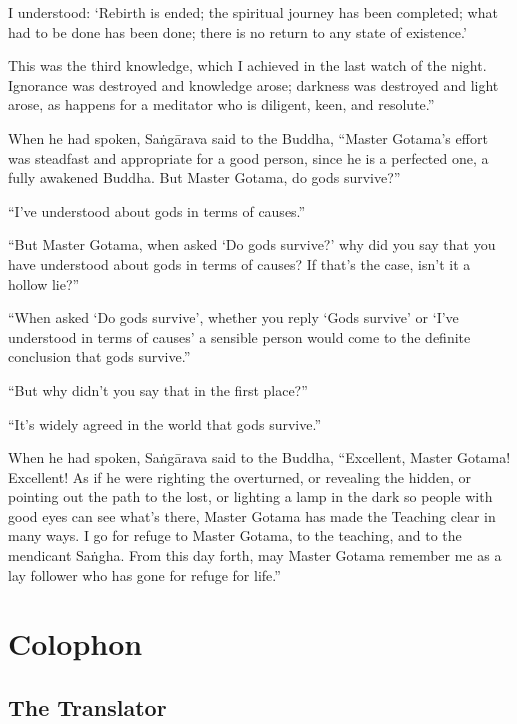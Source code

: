 \documentclass[12pt,openany]{book}%
\let\oldbackmatter\backmatter
\renewcommand{\backmatter}{%
\chapterfont{\setstretch{.85}\normalfont\centering}%
\sectionfont{\setstretch{.85}\Semiboldsubheadfont}%
\oldbackmatter}
\begin{document}
I understood: ‘Rebirth is ended; the spiritual journey has been completed; what had to be done has been done; there is no return to any state of existence.’ 

This was the third knowledge, which I achieved in the last watch of the night. Ignorance was destroyed and knowledge arose; darkness was destroyed and light arose, as happens for a meditator who is diligent, keen, and resolute.” 

When he had spoken, \textsanskrit{Saṅgārava} said to the Buddha, “Master Gotama’s effort was steadfast and appropriate for a good person, since he is a perfected one, a fully awakened Buddha. But Master Gotama, do gods survive?” 

“I’ve understood about gods in terms of causes.” 

“But Master Gotama, when asked ‘Do gods survive?’ why did you say that you have understood about gods in terms of causes? If that’s the case, isn’t it a hollow lie?” 

“When asked ‘Do gods survive’, whether you reply ‘Gods survive’ or ‘I’ve understood in terms of causes’ a sensible person would come to the definite conclusion that gods survive.” 

“But why didn’t you say that in the first place?” 

“It’s widely agreed in the world that gods survive.” 

When he had spoken, \textsanskrit{Saṅgārava} said to the Buddha, “Excellent, Master Gotama! Excellent! As if he were righting the overturned, or revealing the hidden, or pointing out the path to the lost, or lighting a lamp in the dark so people with good eyes can see what’s there, Master Gotama has made the Teaching clear in many ways. I go for refuge to Master Gotama, to the teaching, and to the mendicant \textsanskrit{Saṅgha}. From this day forth, may Master Gotama remember me as a lay follower who has gone for refuge for life.” 

%
\backmatter%
\chapter*{Colophon}

\section*{The Translator}
\end{document}

